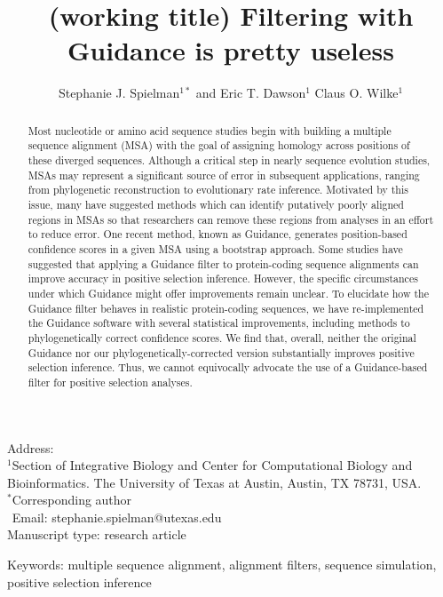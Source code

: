 \documentclass[10pt]{article}
\begin{document}
\title{\textbf{(working title) Filtering with Guidance is pretty useless}}
\author{Stephanie J. Spielman$^{1*}$ and Eric T. Dawson$^{1}$ Claus O. Wilke$^{1}$}
\date{}

\maketitle
\noindent
Address:\\
$^1$Section of Integrative Biology and Center for Computational Biology and Bioinformatics. The University
of Texas at Austin, Austin, TX 78731, USA.\\

\bigskip
\noindent
$^*$Corresponding author\\
$\phantom{^*}$Email: stephanie.spielman@utexas.edu\\

\bigskip
\noindent
Manuscript type: research article

\bigskip
\noindent Keywords: multiple sequence alignment, alignment filters, sequence simulation, positive selection inference

\newpage
\begin{abstract}
	Most nucleotide or amino acid sequence studies begin with building a multiple sequence alignment (MSA) with the goal of assigning homology across positions of these diverged sequences. Although a critical step in nearly sequence evolution studies, MSAs may represent a significant source of error in subsequent applications, ranging from phylogenetic reconstruction to evolutionary rate inference. Motivated by this issue, many have suggested methods which can identify putatively poorly aligned regions in MSAs so that researchers can remove these regions from analyses in an effort to reduce error. One recent method, known as Guidance, generates position-based confidence scores in a given MSA using a bootstrap approach. Some studies have suggested that applying a Guidance filter to protein-coding sequence alignments can improve accuracy in positive selection inference. However, the specific circumstances under which Guidance might offer improvements remain unclear. To elucidate how the Guidance filter behaves in realistic protein-coding sequences, we have re-implemented the Guidance software with several statistical improvements, including methods to phylogenetically correct confidence scores. We find that, overall, neither the original Guidance nor our phylogenetically-corrected version substantially improves positive selection inference. Thus, we cannot equivocally advocate the use of a Guidance-based filter for positive selection analyses.
\end{abstract}
\end{document}
